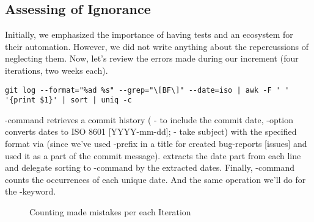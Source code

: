 
\newpage
\subsection{Assessing of Ignorance} \label{ut-fail}

Initially, we emphasized the importance of having tests and an ecosystem for their automation. However, we did not write 
anything about the repercussions of neglecting them. Now, let's review the errors made during our increment (four 
iterations, two weeks each).

\begin{lstlisting}[language=terminal]
git log --format="%ad %s" --grep="\[BF\]" --date=iso | awk -F ' ' '{print $1}' | sort | uniq -c
\end{lstlisting}

\noindent {}-command retrieves a commit history ( - to include the commit date, -option 
converts dates to ISO 8601 [YYYY-mm-dd];  - take subject) with the specified format via  (since we've 
used \q{[BF]}-prefix in a title for created bug-reports [issues] and used it as a part of the commit message).  
extracts the date part from each line and delegate sorting to -command by the extracted dates. Finally, 
-command counts the occurrences of each unique date. And the same operation we'll do for the -keyword.

\begin{figure}[h]
  \begin{center}
  \end{center}
  \caption{Counting made mistakes per each Iteration}\label{graph:errors}
\end{figure}

